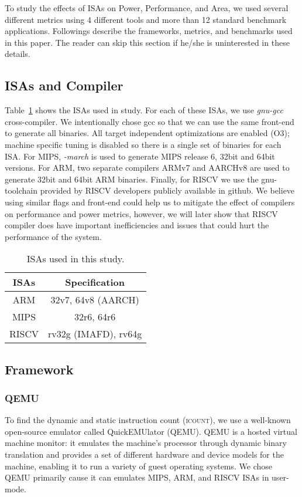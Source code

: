
\newcommand{\icount}{\textsc{icount}\xspace}

To study the effects of ISAs on Power, Performance, and Area, we used several different metrics using 4 different tools and more than 12 standard benchmark applications. Followings describe the frameworks, metrics, and benchmarks used in this paper. The reader can skip this section if he/she is uninterested in these details. 

\subsection{ISAs and Compiler}
Table~\ref{t:isa} shows the ISAs used in study. For each of these ISAs, we use \textit{gnu-gcc} cross-compiler. We intentionally chose gcc so
that we can use the same front-end to generate all binaries. All
target independent optimizations are enabled (O3); machine specific
tuning is disabled so there is a single set of binaries for each ISA. For MIPS, \textit{-march} is used to generate MIPS release 6, 32bit and 64bit versions. For ARM, two separate compilers ARMv7 and AARCHv8 are used to generate 32bit and 64bit ARM binaries. Finally, for RISCV we use the gnu-toolchain provided by RISCV developers publicly available in github. We believe using similar flags and front-end could help us to mitigate the effect of compilers on performance and power metrics, however, we will later show that RISCV compiler does have important inefficiencies and issues that could hurt the performance of the system. 

\begin{table}[h]
\centering
\caption{ISAs used in this study.}
\begin{tabular}{|c|c|}
\hline
\small \textbf{ISAs} & \small \textbf{Specification} \\
\hline \hline
\small ARM & \small  32v7, 64v8 (AARCH) \\
\hline
\small MIPS & \small 32r6, 64r6 \\
\hline
\small RISCV &\small  rv32g (IMAFD), rv64g \\
\hline
\end{tabular}
\label{t:isa}
\end{table}

\subsection{Framework} 
\subsubsection{QEMU}
To find the dynamic and static instruction count (\icount), we use a well-known open-source emulator called QuickEMUlator (QEMU). QEMU is a hosted virtual machine monitor: it emulates the machine's processor through dynamic binary translation and provides a set of different hardware and device models for the machine, enabling it to run a variety of guest operating systems. We chose QEMU primarily cause it can emulates MIPS, ARM, and RISCV ISAs in user-mode. 



